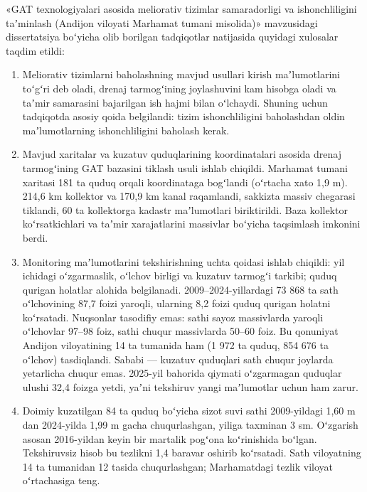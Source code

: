 
«GAT texnologiyalari asosida meliorativ tizimlar samaradorligi va
ishonchliligini taʼminlash (Andijon viloyati Marhamat tumani misolida)»
mavzusidagi dissertatsiya boʻyicha olib borilgan tadqiqotlar natijasida
quyidagi xulosalar taqdim etildi:

\begin{enumerate}
\def\labelenumi{\arabic{enumi}.}
\tightlist
\item
  Meliorativ tizimlarni baholashning mavjud usullari kirish
  maʼlumotlarini toʻgʻri deb oladi, drenaj tarmogʻining joylashuvini kam
  hisobga oladi va taʼmir samarasini bajarilgan ish hajmi bilan
  oʻlchaydi. Shuning uchun tadqiqotda asosiy qoida belgilandi: tizim
  ishonchliligini baholashdan oldin maʼlumotlarning ishonchliligini
  baholash kerak.
\item
  Mavjud xaritalar va kuzatuv quduqlarining koordinatalari asosida
  drenaj tarmogʻining GAT bazasini tiklash usuli ishlab chiqildi.
  Marhamat tumani xaritasi 181 ta quduq orqali koordinataga bogʻlandi
  (oʻrtacha xato 1,9 m). 214,6 km kollektor va 170,9 km kanal
  raqamlandi, sakkizta massiv chegarasi tiklandi, 60 ta kollektorga
  kadastr maʼlumotlari biriktirildi. Baza kollektor koʻrsatkichlari va
  taʼmir xarajatlarini massivlar boʻyicha taqsimlash imkonini berdi.
\item
  Monitoring maʼlumotlarini tekshirishning uchta qoidasi ishlab
  chiqildi: yil ichidagi oʻzgarmaslik, oʻlchov birligi va kuzatuv
  tarmogʻi tarkibi; quduq qurigan holatlar alohida belgilanadi.
  2009--2024-yillardagi 73 868 ta sath oʻlchovining 87,7 foizi yaroqli,
  ularning 8,2 foizi quduq qurigan holatni koʻrsatadi. Nuqsonlar
  tasodifiy emas: sathi sayoz massivlarda yaroqli oʻlchovlar 97--98
  foiz, sathi chuqur massivlarda 50--60 foiz. Bu qonuniyat Andijon
  viloyatining 14 ta tumanida ham (1 972 ta quduq, 854 676 ta oʻlchov)
  tasdiqlandi. Sababi --- kuzatuv quduqlari sath chuqur joylarda
  yetarlicha chuqur emas. 2025-yil bahorida qiymati oʻzgarmagan quduqlar
  ulushi 32,4 foizga yetdi, yaʼni tekshiruv yangi maʼlumotlar uchun ham
  zarur.
\item
  Doimiy kuzatilgan 84 ta quduq boʻyicha sizot suvi sathi 2009-yildagi
  1,60 m dan 2024-yilda 1,99 m gacha chuqurlashgan, yiliga taxminan 3
  sm. Oʻzgarish asosan 2016-yildan keyin bir martalik pogʻona
  koʻrinishida boʻlgan. Tekshiruvsiz hisob bu tezlikni 1,4 baravar
  oshirib koʻrsatadi. Sath viloyatning 14 ta tumanidan 12 tasida
  chuqurlashgan; Marhamatdagi tezlik viloyat oʻrtachasiga teng.

\end{enumerate}
